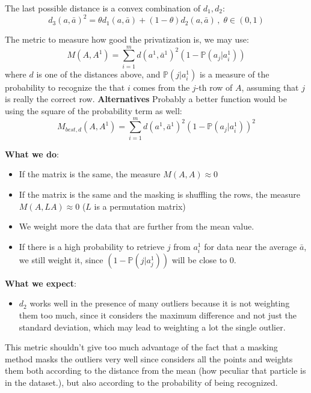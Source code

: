 \documentclass{article}
\renewcommand{\P}{\mathbb{P}}
\begin{document}
The last possible distance is a convex combination of $d_1, d_2$:
\begin{equation}
	d_3(a, \bar{a})^2 = \theta d_1(a, \bar{a}) + (1 - \theta) d_2(a, \bar{a}) \, , \; \theta \in (0, 1)
\end{equation}

The metric to measure how good the privatization is, we may use:
\begin{equation}
	M(A, A^1) = \sum_{i=1}^{m} d(a^1, \bar{a}^1)^2 (1 - \P(a_j | a_i^1) )
\end{equation}
where $d$ is one of the distances above, and $\P(j | a_i^1)$ is a measure of the probability to recognize the that $i$ comes from the $j$-th row of $A$, assuming that $j$ is really the correct row. 
\textbf{Alternatives}
Probably a better function would be using the square of the probability term as well:
\begin{equation}
	M_{best,d}(A, A^1) = \sum_{i=1}^{m} d(a^1, \bar{a}^1)^2 (1 - \P(a_j | a_i^1) )^2
\end{equation}

\textbf{What we do}:
\begin{itemize}
	\item If the matrix is the same, the measure $M(A, A) \approx 0$
	\item If the matrix is the same and the masking is shuffling the rows, the measure $M(A, LA) \approx 0$ ($L$ is a permutation matrix)
	\item We weight more the data that are further from the mean value.
	\item If there is a high probability to retrieve $j$ from $a_i^1$ for data near the average $\bar{a}$, we still weight it, since $(1 - \P(j| a_j^1) )$ will be close to $0$.
\end{itemize}
\textbf{What we expect}:
\begin{itemize}
	\item $d_2$ works well in the presence of many outliers because it is not weighting them too much, since it considers the maximum difference and not just the standard deviation, which may lead to weighting a lot the single outlier.
\end{itemize}

This metric shouldn't give too much advantage of the fact that a masking method masks the outliers very well since considers all the points and weights them both according to the distance from the mean (how peculiar that particle is in the dataset.), but also according to the probability of being recognized.
\end{document}
